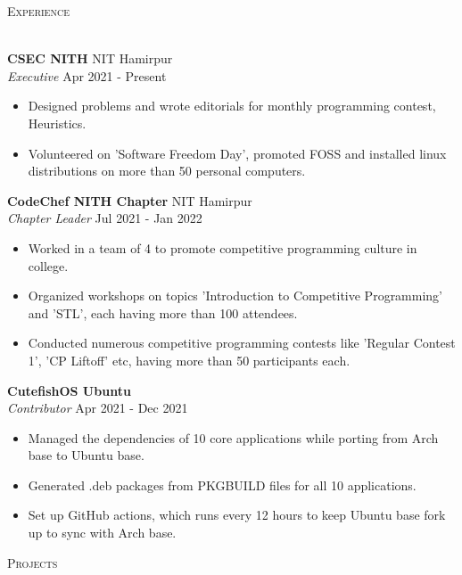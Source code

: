\documentclass[a4paper]{article}
\newcommand{\lineunder} {
    \vspace*{-8pt} \\
    \hspace*{-18pt} \hrulefill \\
}
\newcommand{\header} [1] {
    {\hspace*{-18pt}\vspace*{6pt} \textsc{#1}}
    \vspace*{-6pt} \lineunder
}
\begin{document}

\header{Experience}
\vspace{1mm}

\textbf{CSEC NITH} \hfill NIT Hamirpur\\
\textit{Executive} \hfill Apr 2021 - Present\\
\begin{itemize}
	\item Designed problems and wrote editorials for monthly programming contest, Heuristics.
	\item Volunteered on 'Software Freedom Day', promoted FOSS and installed linux distributions on more than 50 personal computers.
\end{itemize}
\vspace{1.5mm}

\textbf{CodeChef NITH Chapter} \hfill NIT Hamirpur\\
\textit{Chapter Leader} \hfill Jul 2021 - Jan 2022\\
\begin{itemize}
    \item Worked in a team of 4 to promote competitive programming culture in college.
	\item Organized workshops on topics 'Introduction to Competitive Programming' and 'STL', each having more than 100 attendees.
	\item Conducted numerous competitive programming contests like 'Regular Contest 1', 'CP Liftoff' etc, having more than 50 participants each.
\end{itemize}
\vspace{1.5mm}

\textbf{CutefishOS Ubuntu}\\
\textit{Contributor} \hfill Apr 2021 - Dec 2021\\
\begin{itemize}
	\item Managed the dependencies of 10 core applications while porting from Arch base to Ubuntu base.
	\item Generated .deb packages from PKGBUILD files for all 10 applications.
	\item Set up GitHub actions, which runs every 12 hours to keep Ubuntu base fork up to sync with Arch base.
\end{itemize}
\vspace{1.5mm}


\header{Projects}
\vspace{1mm}
\end{document}
